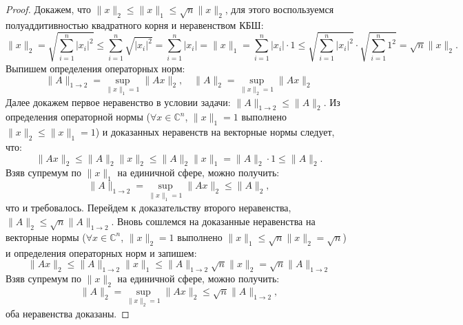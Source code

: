 \documentclass{article}
\newtheorem*{proof}{$\square$}
\renewcommand{\C}{\mathbb{C}}
\renewcommand{\leq}{\leqslant}
\begin{document}
	\begin{proof}		
		Докажем, что $\|x\|_2 \leq \|x\|_1 \leq \sqrt{n}\|x\|_2$, для этого воспользуемся полуаддитивностью квадратного корня и неравенством КБШ:
		\begin{equation*}
			\|x\|_2 = \sqrt{\sum\limits_{i=1}^n |x_i|^2} \leq \sum\limits_{i=1}^n \sqrt{|x_i|^2} = \sum\limits_{i=1}^n |x_i| = \|x\|_1 = \sum\limits_{i=1}^n |x_i| \cdot 1 \leq \sqrt{\sum\limits_{i=1}^n |x_i|^2} \cdot \sqrt{\sum\limits_{i=1}^n 1^2} = \sqrt{n} \|x\|_2.
		\end{equation*}
		Выпишем определения операторных норм:
		\begin{equation*}
			\|A\|_{1\to2} = \sup\limits_{\|x\|_1=1} \|Ax\|_{2},\quad \|A\|_{2} = \sup\limits_{\|x\|_2=1} \|Ax\|_{2}
		\end{equation*}
		Далее докажем первое неравенство в условии задачи: $\|A\|_{1\to 2} \leq  \|A\|_{2}$. Из определения операторной нормы ($\forall x\in\C^n$, $\|x\|_1=1$ выполнено $\|x\|_2 \leq \|x\|_1=1$) и доказанных неравенств на векторные нормы следует, что:
		\begin{equation*}
			\|Ax\|_2 \leq \|A\|_2 \|x\|_2 \leq \|A\|_2 \|x\|_1 =  \|A\|_2 \cdot 1 \leq  \|A\|_2.
		\end{equation*}
		Взяв супремум по $\|x\|_1$ на единичной сфере, можно получить:
		\begin{equation*}
			\|A\|_{1\to2} = \sup\limits_{\|x\|_1=1} \|Ax\|_2  \leq \|A\|_2,
		\end{equation*}
		что и требовалось. Перейдем к доказательству второго неравенства, $\|A\|_{2} \leq \sqrt{n}\|A\|_{1\to 2}$. Вновь сошлемся на доказанные неравенства на векторные нормы ($\forall x\in\C^n$, $\|x\|_2=1$ выполнено $\|x\|_1 \leq \sqrt{n}\|x\|_2=\sqrt{n}$) и определения операторных норм и запишем:
		\begin{equation*}
			\|Ax\|_2 \leq \|A\|_{1\to2} \|x\|_1 \leq \|A\|_{1\to2} \sqrt{n} \|x\|_2 = \sqrt{n} \|A\|_{1\to2} 
		\end{equation*}
		Взяв супремум по $\|x\|_2$ на единичной сфере, можно получить:
		\begin{equation*}
			\|A\|_{2} = \sup\limits_{\|x\|_2=1} \|Ax\|_2  \leq \sqrt{n}\|A\|_{1\to2},
		\end{equation*}
		оба неравенства доказаны.
	\end{proof}
\end{document}
